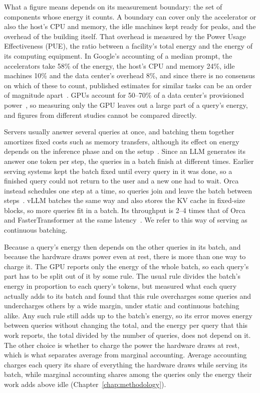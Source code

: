 \documentclass[cic,dipl,english]{infufrgs}
\begin{document}
What a figure means depends on its measurement boundary: the set of components whose
energy it counts. A boundary can cover only the accelerator or also the host's CPU
and memory, the idle machines kept ready for peaks, and the overhead of the building
itself. That
overhead is measured by the Power Usage Effectiveness (PUE), the ratio between a
facility's total energy and the energy of its computing equipment. In Google's
accounting of a median prompt, the accelerators take 58\% of the energy, the host's CPU
and memory 24\%, idle machines 10\% and the data center's overhead 8\%, and since there
is no consensus on which of these to count, published estimates for similar tasks can be
an order of magnitude apart~\cite{elsworth2025measuring}. GPUs account for 50--70\% of a
data center's provisioned power~\cite{chung2025mlenergy}, so measuring only the GPU
leaves out a large part of a query's energy, and figures from different studies cannot
be compared directly.

Servers usually answer several queries at once, and batching them together amortizes
fixed costs such as memory transfers, although its effect on energy depends on the
inference phase and on the setup~\cite{delavande2026understanding}. Since an LLM
generates its answer one token per step, the queries in a batch finish at different
times. Earlier serving systems kept the batch fixed until every query in it was done, so
a finished query could not return to the user and a new one had to wait. Orca instead
schedules one step at a time, so queries join and leave the batch between
steps~\cite{yu2022orca}. vLLM batches the same way and also stores the KV cache in
fixed-size blocks, so more queries fit in a batch. Its throughput is 2--4 times that of
Orca and FasterTransformer at the same latency~\cite{kwon2023vllm}. We refer to this way
of serving as continuous batching.

Because a query's energy then depends on the other queries in its batch, and because the
hardware draws power even at rest, there is more than one way to charge it. The GPU reports
only the energy of the whole batch, so each query's part has to be split out of it by some
rule. The usual rule divides the batch's energy in proportion to each query's tokens, but
 measured what each query actually adds to its batch and found
that this rule overcharges some queries and undercharges others by a wide margin, under
static and continuous batching alike. Any such rule still adds up to the batch's energy, so
its error moves energy between queries without changing the total, and the energy per query
that this work reports, the total divided by the number of queries, does not depend on it.
The other choice is whether to charge the power the hardware draws at rest, which is what
separates average from marginal accounting. Average accounting charges each query its share
of everything the hardware draws while serving its batch, while marginal accounting shares
among the queries only the energy their work adds above idle
(Chapter~\ref{chap:methodology}).
\end{document}
